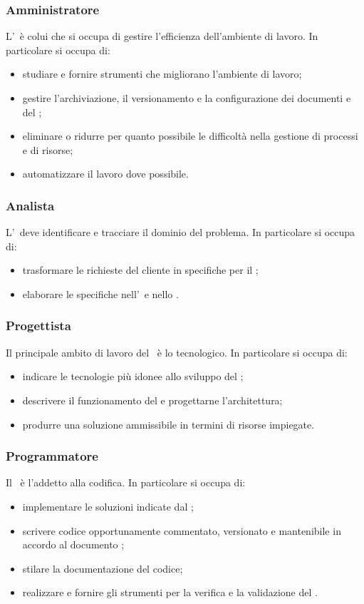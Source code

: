 \documentclass[../NormeDiProgetto.tex]{subfiles}
\begin{document}
			\subsubsection{Amministratore}
				L'\amministratore\ è colui che si occupa di gestire l'efficienza dell'ambiente di lavoro. 
				In particolare si occupa di:
				\begin{itemize}
					\item studiare e fornire strumenti che migliorano l'ambiente di lavoro;
					\item gestire l'archiviazione, il versionamento e la configurazione dei documenti e del ;
					\item eliminare o ridurre per quanto possibile le difficoltà nella gestione di processi e di risorse;
					\item automatizzare il lavoro dove possibile.
				\end{itemize}
			\subsubsection{Analista}
				L'\analista\ deve identificare e tracciare il dominio del problema. 
				In particolare si occupa di:
				\begin{itemize}
					\item trasformare le richieste del cliente in specifiche per il ;
					\item elaborare le specifiche nell'\analisideirequisiti\ e nello \studiodifattibilita.
				\end{itemize} 
			\subsubsection{Progettista}
				Il principale ambito di lavoro del \progettista\ è lo  tecnologico.
				In particolare si occupa di:
				\begin{itemize}
					\item indicare le tecnologie più idonee allo sviluppo del ;
					\item descrivere il funzionamento del  e progettarne l'architettura;
					\item produrre una soluzione ammissibile in termini di risorse impiegate.
				\end{itemize}	
			\subsubsection{Programmatore}
				Il \programmatore\ è l'addetto alla codifica.
				In particolare si occupa di:
				\begin{itemize}
					\item implementare le soluzioni indicate dal \progettista;
					\item scrivere codice opportunamente commentato, versionato e mantenibile in accordo al documento \normediprogetto;
					\item stilare la documentazione del codice;
					\item realizzare e fornire gli strumenti per la verifica e la validazione del .
				\end{itemize}
\end{document}
